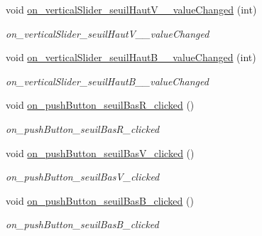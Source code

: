 \begin{DoxyCompactItemize}
\mbox{\label{classAppMainWindow_a59a345a43be67123c4c665d9a063fa49}} 
void \hyperlink{classAppMainWindow_a59a345a43be67123c4c665d9a063fa49}{on\+\_\+vertical\+Slider\+\_\+seuil\+Haut\+V\+\_\+\_\+value\+Changed} (int)
\begin{DoxyCompactList}\small\item\em on\+\_\+vertical\+Slider\+\_\+seuil\+Haut\+V\+\_\+\_\+value\+Changed \end{DoxyCompactList}\item 
\mbox{\label{classAppMainWindow_ae8a4edfe036f0147ce8d17f538f83940}} 
void \hyperlink{classAppMainWindow_ae8a4edfe036f0147ce8d17f538f83940}{on\+\_\+vertical\+Slider\+\_\+seuil\+Haut\+B\+\_\+\_\+value\+Changed} (int)
\begin{DoxyCompactList}\small\item\em on\+\_\+vertical\+Slider\+\_\+seuil\+Haut\+B\+\_\+\_\+value\+Changed \end{DoxyCompactList}\item 
\mbox{\label{classAppMainWindow_a1d28822195b9844712f8bb2f519d293e}} 
void \hyperlink{classAppMainWindow_a1d28822195b9844712f8bb2f519d293e}{on\+\_\+push\+Button\+\_\+seuil\+Bas\+R\+\_\+clicked} ()
\begin{DoxyCompactList}\small\item\em on\+\_\+push\+Button\+\_\+seuil\+Bas\+R\+\_\+clicked \end{DoxyCompactList}\item 
\mbox{\label{classAppMainWindow_ac3546f29e76445f9828b261114784d11}} 
void \hyperlink{classAppMainWindow_ac3546f29e76445f9828b261114784d11}{on\+\_\+push\+Button\+\_\+seuil\+Bas\+V\+\_\+clicked} ()
\begin{DoxyCompactList}\small\item\em on\+\_\+push\+Button\+\_\+seuil\+Bas\+V\+\_\+clicked \end{DoxyCompactList}\item 
\mbox{\label{classAppMainWindow_a439ed3f28e156af83fd33534bb798e0c}} 
void \hyperlink{classAppMainWindow_a439ed3f28e156af83fd33534bb798e0c}{on\+\_\+push\+Button\+\_\+seuil\+Bas\+B\+\_\+clicked} ()
\begin{DoxyCompactList}\small\item\em on\+\_\+push\+Button\+\_\+seuil\+Bas\+B\+\_\+clicked \end{DoxyCompactList}\item 

\end{DoxyCompactItemize}
